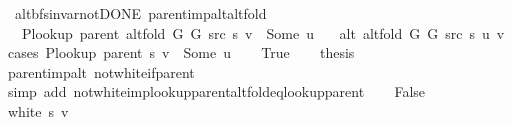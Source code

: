 \begin{isabellebody}
{}
\isamarkuptrue%
%
\endisatagdocument
{\isafolddocument}%
%
\isadelimdocument
%
\endisadelimdocument
{}\isamarkupfalse%
\ {\isacharparenleft}{\kern0pt}\ alt{\isacharunderscore}{\kern0pt}bfs{\isacharunderscore}{\kern0pt}invar{\isacharunderscore}{\kern0pt}not{\isacharunderscore}{\kern0pt}DONE{\isacharparenright}{\kern0pt}\ parent{\isacharunderscore}{\kern0pt}imp{\isacharunderscore}{\kern0pt}alt{\isacharunderscore}{\kern0pt}alt{\isacharunderscore}{\kern0pt}fold{\isacharcolon}{\kern0pt}\isanewline
\ \ \ {\isachardoublequoteopen}P{\isacharunderscore}{\kern0pt}lookup\ {\isacharparenleft}{\kern0pt}parent\ {\isacharparenleft}{\kern0pt}alt{\isacharunderscore}{\kern0pt}fold\ G{}\ G{}\ src\ s{\isacharparenright}{\kern0pt}{\isacharparenright}{\kern0pt}\ v\ {\isacharequal}{\kern0pt}\ Some\ u{\isachardoublequoteclose}\isanewline
\ \ \ {\isachardoublequoteopen}alt\ {\isacharparenleft}{\kern0pt}alt{\isacharunderscore}{\kern0pt}fold\ G{}\ G{}\ src\ s{\isacharparenright}{\kern0pt}\ u\ v{\isachardoublequoteclose}\isanewline
%
\isadelimproof
%
\endisadelimproof
%
\isatagproof
{}\isamarkupfalse%
\ {\isacharparenleft}{\kern0pt}cases\ {\isachardoublequoteopen}P{\isacharunderscore}{\kern0pt}lookup\ {\isacharparenleft}{\kern0pt}parent\ s{\isacharparenright}{\kern0pt}\ v\ {\isacharequal}{\kern0pt}\ Some\ u{\isachardoublequoteclose}{\isacharparenright}{\kern0pt}\isanewline
\ \ \isamarkupfalse%
\ True\isanewline
\ \ \isamarkupfalse%
\ {\isacharquery}{\kern0pt}thesis\isanewline
\ \ \ \ \isamarkupfalse%
\ parent{\isacharunderscore}{\kern0pt}imp{\isacharunderscore}{\kern0pt}alt\ not{\isacharunderscore}{\kern0pt}white{\isacharunderscore}{\kern0pt}if{\isacharunderscore}{\kern0pt}parent\isanewline
\ \ \ \ \isamarkupfalse%
\ {\isacharparenleft}{\kern0pt}simp\ add{\isacharcolon}{\kern0pt}\ not{\isacharunderscore}{\kern0pt}white{\isacharunderscore}{\kern0pt}imp{\isacharunderscore}{\kern0pt}lookup{\isacharunderscore}{\kern0pt}parent{\isacharunderscore}{\kern0pt}alt{\isacharunderscore}{\kern0pt}fold{\isacharunderscore}{\kern0pt}eq{\isacharunderscore}{\kern0pt}lookup{\isacharunderscore}{\kern0pt}parent{\isacharparenright}{\kern0pt}\isanewline
{}\isamarkupfalse%
\isanewline
\ \ \isamarkupfalse%
\ False\isanewline
\ \ \isamarkupfalse%
\ {\isachardoublequoteopen}white\ s\ v{\isachardoublequoteclose}\isanewline
\ \ \ \ \isamarkupfalse%

\end{isabellebody}
